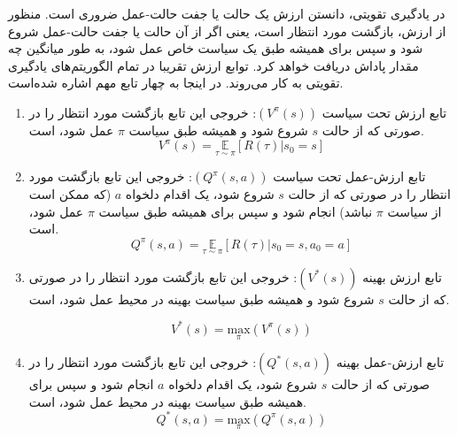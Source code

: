    در یادگیری تقویتی، دانستن ارزش
    یک حالت یا جفت حالت-عمل ضروری است. منظور از ارزش، بازگشت مورد انتظار
     است، یعنی اگر از آن حالت یا جفت حالت-عمل شروع شود و سپس برای همیشه طبق یک سیاست خاص عمل شود، به طور میانگین چه مقدار پاداش دریافت خواهد کرد. توابع ارزش تقریبا در تمام الگوریتم‌های یادگیری تقویتی به کار می‌روند.
   در اینجا به چهار تابع مهم اشاره شده‌است.
   \begin{enumerate}
   	
   	\item تابع ارزش تحت سیاست 
   	  $(V^{\pi}(s))$:
   	  خروجی این تابع بازگشت مورد انتظار را در صورتی که از حالت $s$ شروع شود و همیشه طبق سیاست $\pi$ عمل شود، است.
   	   \begin{equation}
   	   	V^{\pi}(s) = \underset{\tau \sim \pi}{\mathbb{E}}\left[R(\tau)|s_0 = s\right]
   	   \end{equation}
   	   
   	\item تابع ارزش-عمل تحت سیاست 
   	$(Q^{\pi}(s, a))$:
   	خروجی این تابع بازگشت مورد انتظار را در صورتی که از حالت $s$ شروع شود، یک اقدام دلخواه $a$ (که ممکن است از سیاست $\pi$ نباشد) انجام شود و سپس برای همیشه طبق سیاست $\pi$ عمل شود، است.
		\begin{equation}
		Q^{\pi}(s, a) = \underset{\tau \sim \pi}{\mathbb{E}}\left[R(\tau)|s_0 = s, a_0 = a\right]
		\end{equation}

 	
   	\item تابع ارزش بهینه
   	  $(V^*(s))$: 
   	 خروجی این تابع بازگشت مورد انتظار را در صورتی که از حالت $s$ شروع شود و همیشه طبق سیاست بهینه در محیط عمل شود، است.

	 \begin{equation}
	 V^*(s) = \underset{\pi}{\mathrm{max}} (V^{\pi}(s))
	 \end{equation}
   	
   	\item تابع ارزش-عمل بهینه
   	  $(Q^*(s, a))$:
   	خروجی این تابع بازگشت مورد انتظار را در صورتی که از حالت $s$ شروع شود، یک اقدام دلخواه $a$ انجام شود و سپس برای همیشه طبق سیاست بهینه در محیط عمل شود، است.
		\begin{equation}
		Q^*(s, a) = \underset{\pi}{\mathrm{max}} (Q^{\pi}(s, a))
		\end{equation}
   	
   \end{enumerate}
 
   
  
  
  
  
  
  
  
  